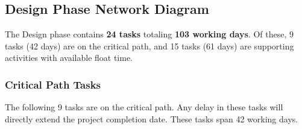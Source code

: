 
\subsection{Design Phase Network Diagram}

The Design phase contains \textbf{24 tasks} totaling \textbf{103 working days}. 
Of these, 9 tasks (42 days) are on the critical path, 
and 15 tasks (61 days) are supporting activities with available float time.

\vspace{0.5em}

\subsubsection{Critical Path Tasks}

\noindent The following 9 tasks are on the critical path. 
Any delay in these tasks will directly extend the project completion date. 
These tasks span 42 working days.

\vspace{0.5em}


